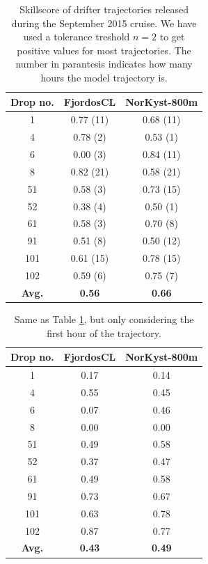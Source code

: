 \begin{table}
\begin{center}
  \begin{tabular}{ | c | c | c |}
    \hline
    {\bf Drop no.} & {\bf FjordosCL} & {\bf NorKyst-800m} \\ \hline
    1 & 0.77 (11) & 0.68 (11) \\ 
    4 & 0.78 (2) & 0.53 (1) \\
    6 & 0.00 (3) & 0.84 (11) \\
    8 & 0.82 (21) & 0.58 (21) \\
    51 & 0.58 (3) & 0.73 (15) \\
    52 & 0.38 (4) & 0.50 (1) \\
    61 & 0.58 (3) & 0.70 (8) \\
    91 & 0.51 (8) & 0.50 (12) \\
    101 & 0.61 (15) & 0.78 (15) \\
    102 & 0.59 (6) & 0.75 (7) \\ \hline
    {\bf Avg.} & {\bf 0.56} & {\bf 0.66} \\
    \hline
  \end{tabular}
\caption{Skillscore of drifter trajectories released during the September 2015 cruise. We have used a tolerance treshold $n=2$ to get positive values for most trajectories. The number in parantesis indicates how many hours the model trajectory is.}
\label{tab:skillscore_full}
\end{center}
\end{table}

\begin{table}
\begin{center}
  \begin{tabular}{ | c | c | c |}
    \hline
    {\bf Drop no.} & {\bf FjordosCL} & {\bf NorKyst-800m} \\ \hline
    1 & 0.17 & 0.14 \\ 
    4 & 0.55 & 0.45 \\
    6 & 0.07 & 0.46 \\
    8 & 0.00 & 0.00 \\
    51 & 0.49 & 0.58 \\
    52 & 0.37 & 0.47 \\
    61 & 0.49 & 0.58 \\
    91 & 0.73 & 0.67 \\
    101 & 0.63 & 0.78 \\
    102 & 0.87 & 0.77 \\ \hline
    {\bf Avg.} & {\bf 0.43} & {\bf 0.49} \\
    \hline
  \end{tabular}
\caption{Same as Table \ref{tab:skillscore_full}, but only considering the first hour of the trajectory.}
\label{tab:skillscore_1hr}
\end{center}
\end{table}

